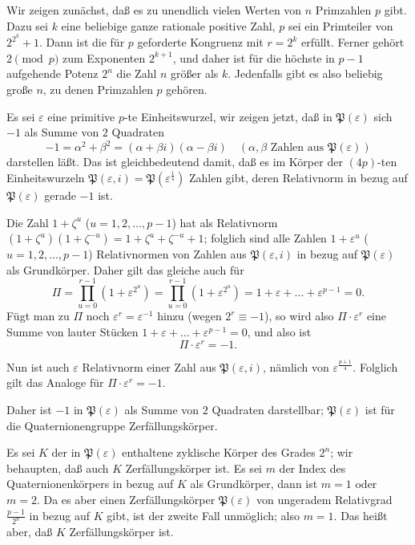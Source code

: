 \documentclass[12pt,a4paper]{article}
\newcommand{\PP}{\mathfrak{P}}          %
\theoremstyle{definition}
\begin{document}
Wir zeigen zun\"achst, da\ss{} es zu unendlich vielen Werten von $n$
Primzahlen $p$ gibt. Dazu sei $k$ eine beliebige ganze rationale positive
Zahl, $p$ sei ein Primteiler von $2^{2^k}+1$. Dann ist die f\"ur $p$
geforderte Kongruenz mit $r = 2^k$ erf\"ullt. Ferner geh\"ort $2\pmod{p}$
zum Exponenten $2^{k+1}$, und daher ist f\"ur die h\"ochste in $p-1$
aufgehende Potenz $2^n$ die Zahl $n$ gr\"o\ss er als $k$. Jedenfalls gibt es
also beliebig gro\ss e $n$, zu denen Primzahlen $p$ geh\"oren.

Es sei $\varepsilon$ eine primitive $p$-te Einheitswurzel, wir zeigen jetzt,
da\ss{} in $\PP(\varepsilon)$ sich $-1$ als Summe von $2$ Quadraten
\[
-1 = \alpha^2 + \beta^2 = (\alpha + \beta i)(\alpha - \beta i)
\quad (\alpha, \beta \text{ Zahlen aus } \PP(\varepsilon))
\]
darstellen l\"a\ss t. Das ist gleichbedeutend damit, da\ss{} es im K\"orper der
$(4p)$-ten Einheitswurzeln $\PP(\varepsilon, i) = \PP(\varepsilon^{\frac{1}{4}})$
Zahlen gibt, deren Relativnorm in bezug auf $\PP(\varepsilon)$ gerade $-1$
ist.

Die Zahl $1 + \zeta^ u$ ($ u = 1, 2, \dots, p-1$) hat als Relativnorm
$(1 + \zeta^ u)(1 + \zeta^{- u}) = 1 + \zeta^ u + \zeta^{- u} + 1$;
folglich sind alle Zahlen $1 + \varepsilon^ u$ ($ u = 1, 2, \dots, p-1$)
Relativnormen von Zahlen aus $\PP(\varepsilon, i)$ in bezug auf
$\PP(\varepsilon)$ als Grundk\"orper. Daher gilt das gleiche auch f\"ur
\[
\Pi = \prod_{ u=0}^{r-1}(1 + \varepsilon^{2^ u})
= \prod_{ u=0}^{r-1}(1 + \varepsilon^{2^ u})
= 1 + \varepsilon + \dots + \varepsilon^{p-1} = 0.
\]
F\"ugt man zu $\Pi$ noch $\varepsilon^r = \varepsilon^{-1}$ hinzu (wegen
$2^r \equiv -1$), so wird also $\Pi \cdot \varepsilon^r$ eine Summe von
lauter St\"ucken $1 + \varepsilon + \dots + \varepsilon^{p-1} = 0$, und also
ist
\[
\Pi \cdot \varepsilon^r = -1.
\]

Nun ist auch $\varepsilon$ Relativnorm einer Zahl aus $\PP(\varepsilon, i)$,
n\"amlich von $\varepsilon^{\frac{p+1}{4}}$. Folglich gilt das Analoge f\"ur
$\Pi \cdot \varepsilon^r = -1$.

Daher ist $-1$ in $\PP(\varepsilon)$ als Summe von $2$ Quadraten
darstellbar; $\PP(\varepsilon)$ ist f\"ur die Quaternionengruppe
Zerf\"allungsk\"orper.

Es sei $K$ der in $\PP(\varepsilon)$ enthaltene zyklische K\"orper des
Grades $2^n$; wir behaupten, da\ss{} auch $K$ Zerf\"allungsk\"orper ist. Es
sei $m$ der Index des Quaternionenk\"orpers in bezug auf $K$ als
Grundk\"orper, dann ist $m = 1$ oder $m = 2$. Da es aber einen
Zerf\"allungsk\"orper $\PP(\varepsilon)$ von ungeradem Relativgrad $\frac{p-1}{2^n}$
in bezug auf $K$ gibt, ist der zweite Fall unm\"oglich; also $m = 1$.
Das hei\ss t aber, da\ss{} $K$ Zerf\"allungsk\"orper ist.
\end{document}
